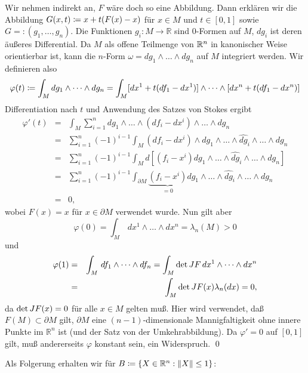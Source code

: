 \documentclass[a4paper,twoside,DIV15,BCOR12mm]{scrbook}
\begin{document}
 Wir nehmen indirekt an, $F$ wäre doch so 
eine Abbildung. Dann erklären wir die Abbildung
 $G(x,t) \da  x + t(F(x) - x)$ für $x \in M$ und 
$t \in [0,1]$ sowie $G = :(g_{1},\dots,g_{n})$. Die Funktionen $g_{i} : 
M \to {\mathbb R}$ sind 0-Formen auf $M$, $dg_{i}$ ist deren äußeres 
Differential. Da $M$ als offene Teilmenge von $\mathbb{R}^n$ in kanonischer Weise 
orientierbar ist, kann die $n$-Form $\omega = dg_{1} \wedge \dots 
\wedge dg_{n}$ auf $M$ integriert werden. Wir definieren also
\[ \varphi(t) \da  \int_{M} dg_{1} \wedge \dots \wedge dg_{n} = 
\int_{M} [dx^{1} + t(df_{1} - dx^{1})] \wedge \dots \wedge [dx^{n} + 
t(df_{1} - dx^{n})] \]
Differentiation nach $t$ und Anwendung des Satzes von 
Stokes ergibt
\begin{eqnarray*} 
\varphi'(t) & = & \int_{M} \sum_{i=1}^{n} dg_{1} \wedge \dots \wedge 
(df_{i} - dx^{i}) \wedge \dots \wedge dg_{n} \\
& = & \sum_{i=1}^{n} (-1)^{i-1} \int_{M} (df_{i} - dx^{i}) \wedge 
dg_{1} \wedge \dots \wedge \widehat{dg}_{i} \wedge \dots \wedge 
dg_{n} \\
& = & \sum_{i=1}^{n} (-1)^{i-1} \int_{M} d[(f_{i}-x^{i}) dg_{1} 
\wedge \dots \wedge \widehat{dg}_{i} \wedge \dots \wedge dg_{n}] \\
& = & \sum_{i=1}^{n} (-1)^{i-1} \int_{\partial M} 
\underbrace{(f_{i}-x^{i})}_{= 0} dg_{1} \wedge \dots \wedge 
\widehat{dg}_{i} \wedge \dots \wedge dg_{n} \\
& = & 0,
\end{eqnarray*}
wobei $F(x)=x$ für $x\in\partial M$ verwendet wurde. 
Nun gilt aber
\[ \varphi(0) = \int_{M} \, dx^{1} \wedge \dots \wedge dx^{n} = 
\lambda_{n}(M) > 0 \]
und
\begin{eqnarray*}
\varphi(1) & = & \int_{M} \, df_{1} \wedge \dots \wedge df_{n} = 
\int_{M} {\rm det}\, JF \, dx^{1} \wedge \dots \wedge dx^{n} \\
& = & \int_{M} {\rm det}\, JF(x) \lambda_{n}(dx) = 0,
\end{eqnarray*}
da ${\rm det}\, JF(x) = 0$ für alle $x \in M$ gelten muß. Hier wird 
verwendet, daß $F(M) \subset \partial M$ gilt, $\partial M$ eine 
$(n-1)$-dimensionale Mannigfaltigkeit ohne innere Punkte im ${\mathbb 
R}^{n}$ ist (und der Satz von der Umkehrabbildung). Da  $\varphi' = 0$ 
auf $[0,1]$ gilt, muß andererseits 
$\varphi$ konstant sein, ein Widerspruch. \qed\\

\bigskip

\noindent
Als Folgerung erhalten wir für $B \da  \{X \in {\mathbb R}^{n}: \|X\| 
\le 1\}$:
\end{document}
